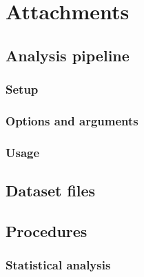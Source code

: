 \documentclass[12pt,a4paper]{report}
\begin{document}
\appendix
\chapter{Attachments}

\singlespacing


\section{Analysis pipeline}

\subsection{Setup}

\subsection{Options and arguments}

\subsection{Usage}


\section{Dataset files}



\section{Procedures}

\subsection{Statistical analysis}
\end{document}
